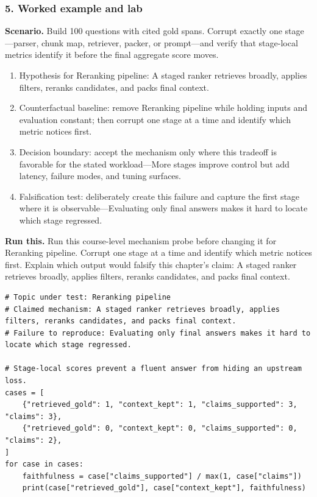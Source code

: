 \subsubsection*{5. Worked example and lab}
\textbf{Scenario.} Build 100 questions with cited gold spans. Corrupt exactly one stage—parser, chunk map, retriever, packer, or prompt—and verify that stage-local metrics identify it before the final aggregate score moves.
\begin{enumerate}
\item Hypothesis for Reranking pipeline: A staged ranker retrieves broadly, applies filters, reranks candidates, and packs final context.
\item Counterfactual baseline: remove Reranking pipeline while holding inputs and evaluation constant; then corrupt one stage at a time and identify which metric notices first.
\item Decision boundary: accept the mechanism only where this tradeoff is favorable for the stated workload—More stages improve control but add latency, failure modes, and tuning surfaces.
\item Falsification test: deliberately create this failure and capture the first stage where it is observable—Evaluating only final answers makes it hard to locate which stage regressed.
\end{enumerate}
\textbf{Run this.} Run this course-level mechanism probe before changing it for Reranking pipeline. Corrupt one stage at a time and identify which metric notices first. Explain which output would falsify this chapter's claim: A staged ranker retrieves broadly, applies filters, reranks candidates, and packs final context.
\begin{Verbatim}[fontsize=\scriptsize]
# Topic under test: Reranking pipeline
# Claimed mechanism: A staged ranker retrieves broadly, applies filters, reranks candidates, and packs final context.
# Failure to reproduce: Evaluating only final answers makes it hard to locate which stage regressed.

# Stage-local scores prevent a fluent answer from hiding an upstream loss.
cases = [
    {"retrieved_gold": 1, "context_kept": 1, "claims_supported": 3, "claims": 3},
    {"retrieved_gold": 0, "context_kept": 0, "claims_supported": 0, "claims": 2},
]
for case in cases:
    faithfulness = case["claims_supported"] / max(1, case["claims"])
    print(case["retrieved_gold"], case["context_kept"], faithfulness)
\end{Verbatim}
